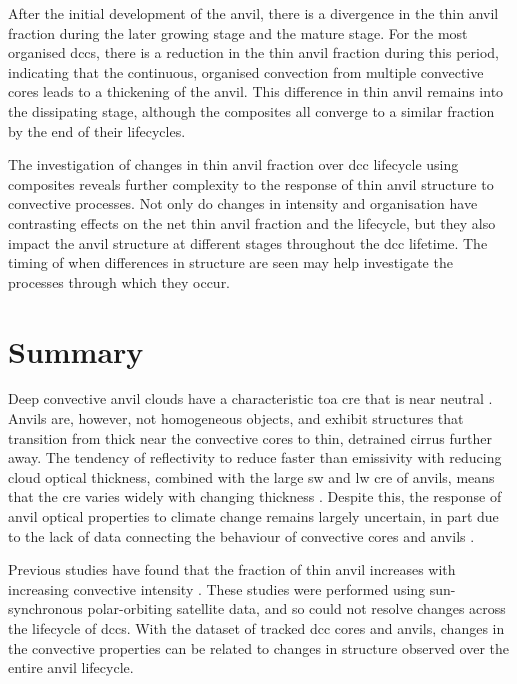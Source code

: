 After the initial development of the anvil, there is a divergence in the thin anvil fraction during the later growing stage and the mature stage.
For the most organised \acrshort{dcc}s, there is a reduction in the thin anvil fraction during this period, indicating that the continuous, organised convection from multiple convective cores leads to a thickening of the anvil.
This difference in thin anvil remains into the dissipating stage, although the composites all converge to a similar fraction by the end of their lifecycles.

The investigation of changes in thin anvil fraction over \acrshort{dcc} lifecycle using composites reveals further complexity to the response of thin anvil structure to convective processes.
Not only do changes in intensity and organisation have contrasting effects on the net thin anvil fraction and the lifecycle, but they also impact the anvil structure at different stages throughout the \acrshort{dcc} lifetime.
The timing of when differences in structure are seen may help investigate the processes through which they occur.


\section{Summary}

Deep convective anvil clouds have a characteristic \acrshort{toa} \acrshort{cre} that is near neutral \citep{hartmann_tropical_2016}.
Anvils are, however, not homogeneous objects, and exhibit structures that transition from thick near the convective cores to thin, detrained cirrus further away.
The tendency of reflectivity to reduce faster than emissivity with reducing cloud optical thickness, combined with the large \acrshort{sw} and \acrshort{lw} \acrshort{cre} of anvils, means that the \acrshort{cre} varies widely with changing thickness \citep{berry_cloud_2014}.
Despite this, the response of anvil optical properties to climate change remains largely uncertain, in part due to the lack of data connecting the behaviour of convective cores and anvils \cite{gasparini_opinion_2023}.

Previous studies have found that the fraction of thin anvil increases with increasing convective intensity \citep{protopapadaki_upper_2017, takahashi_relationships_2017}.
These studies were performed using sun-synchronous polar-orbiting satellite data, and so could not resolve changes across the lifecycle of \acrshort{dcc}s.
With the dataset of tracked \acrshort{dcc} cores and anvils, changes in the convective properties can be related to changes in structure observed over the entire anvil lifecycle.

